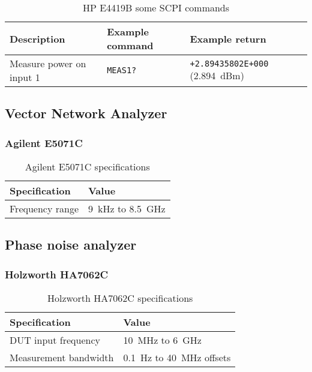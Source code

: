 \begin{table}[H]
	\centering
	\caption{HP E4419B some SCPI commands}
	\label{tab:hp-E4419B-scpi}
	\begin{tabularx}{\textwidth}{Xll}
		\toprule
		\textbf{Description} & \textbf{Example command} & \textbf{Example return}\\
		\midrule
		Measure power on input 1 & \texttt{MEAS1?} & \texttt{+2.89435802E+000} (\SI{2.894}{dBm}) \\
		\bottomrule
	\end{tabularx}
\end{table}

\subsection{Vector Network Analyzer}
\subsubsection{Agilent E5071C}\label{app:agilent-e5071c}
\begin{table}[H]
	\centering
	\caption{Agilent E5071C specifications}
	\label{tab:agilent-E5071C-specs}
	\begin{tabularx}{\textwidth}{ll}
		\toprule
		\textbf{Specification} & \textbf{Value}\\
		\midrule
		Frequency range & \SI{9}{\kHz} to \SI{8.5}{\GHz}
	\end{tabularx}
\end{table}

\subsection{Phase noise analyzer}
\subsubsection{Holzworth HA7062C}\label{app:holzworth-ha7062c}
\begin{table}[H]
	\centering
	\caption{Holzworth HA7062C specifications}
	\label{tab:holzworth-ha7062c-specs}
	\begin{tabularx}{\textwidth}{ll}
		\toprule
		\textbf{Specification} & \textbf{Value}\\
		\midrule
		DUT input frequency & \SI{10}{\MHz} to \SI{6}{\GHz}\\
		Measurement bandwidth & \SI{0.1}{\Hz} to \SI{40}{\MHz} offsets\\
	\end{tabularx}
\end{table}


